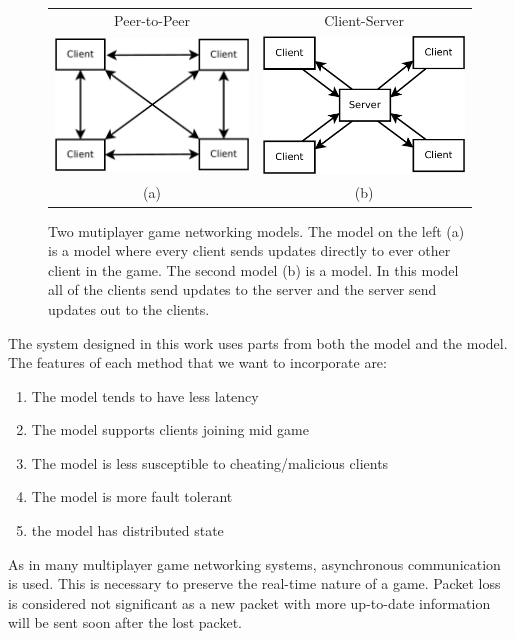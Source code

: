 
	
\begin{figure}[ht]
	\centering
	\begin{tabular}{c c}
		Peer-to-Peer & Client-Server \\
		\includegraphics[width=0.48\linewidth]{../images/p2p-model-crop.pdf} &
		\includegraphics[width=0.48\linewidth]{../images/client-server-model-crop.pdf} \\
		(a) & (b)
	\end{tabular}

	\caption{\label{figure:p2p-vs-ClientServer} Two mutiplayer game networking models. The model on the left (a) is a \ptoP model where every client sends updates directly to ever other client in the game. The second model (b) is a \clientServer model. In this model all of the clients send updates to the server and the server send updates out to the clients.}
	\end{figure}
	
	The system designed in this work uses parts from both the \ptoP model and the \clientServer model. The features of each method that we want to incorporate are:
	\begin{enumerate}
		\item The \clientServer model tends to have less latency
		\item The \clientServer model supports clients joining mid game
		\item The \clientServer model is less susceptible to cheating/malicious clients
		\item The \ptoP model is more fault tolerant
		\item the \ptoP model has distributed state
	\end{enumerate}
	
	As in many multiplayer game networking systems, asynchronous communication is used. This is necessary to preserve the real-time nature of a game. Packet loss is considered not significant as a new packet with more up-to-date information will be sent soon after the lost packet.
	
